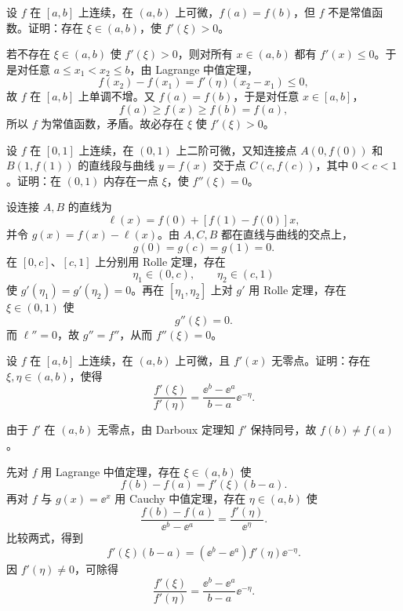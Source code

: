 \begin{xexercise}[16]
设 $f$ 在 $[a,b]$ 上连续，在 $(a,b)$ 上可微，$f(a)=f(b)$，但 $f$ 不是常值函数。证明：存在 $\xi\in(a,b)$，使 $f'(\xi)>0$。
\end{xexercise}
\begin{xsolution}
若不存在 $\xi\in(a,b)$ 使 $f'(\xi)>0$，则对所有 $x\in(a,b)$ 都有 $f'(x)\leqslant0$。于是对任意 $a\leqslant x_1<x_2\leqslant b$，由 Lagrange 中值定理，
\[
  f(x_2)-f(x_1)=f'(\eta)(x_2-x_1)\leqslant0,
\]
故 $f$ 在 $[a,b]$ 上单调不增。又 $f(a)=f(b)$，于是对任意 $x\in[a,b]$，
\[
  f(a)\geqslant f(x)\geqslant f(b)=f(a),
\]
所以 $f$ 为常值函数，矛盾。故必存在 $\xi$ 使 $f'(\xi)>0$。
\end{xsolution}


\begin{xexercise}[17]
设 $f$ 在 $[0,1]$ 上连续，在 $(0,1)$ 上二阶可微，又知连接点 $A(0,f(0))$ 和 $B(1,f(1))$ 的直线段与曲线 $y=f(x)$ 交于点 $C(c,f(c))$，其中 $0<c<1$。证明：在 $(0,1)$ 内存在一点 $\xi$，使 $f''(\xi)=0$。
\end{xexercise}
\begin{xsolution}
设连接 $A,B$ 的直线为
\[
  \ell(x)=f(0)+[f(1)-f(0)]x,
\]
并令 $g(x)=f(x)-\ell(x)$。由 $A,C,B$ 都在直线与曲线的交点上，
\[
  g(0)=g(c)=g(1)=0.
\]
在 $[0,c]$、$[c,1]$ 上分别用 Rolle 定理，存在
\[
  \eta_1\in(0,c),\qquad \eta_2\in(c,1)
\]
使 $g'(\eta_1)=g'(\eta_2)=0$。再在 $[\eta_1,\eta_2]$ 上对 $g'$ 用 Rolle 定理，存在 $\xi\in(0,1)$ 使
\[
  g''(\xi)=0.
\]
而 $\ell''=0$，故 $g''=f''$，从而 $f''(\xi)=0$。
\end{xsolution}


\begin{xexercise}[18]
设 $f$ 在 $[a,b]$ 上连续，在 $(a,b)$ 上可微，且 $f'(x)$ 无零点。证明：存在 $\xi,\eta\in(a,b)$，使得
\[
  \frac{f'(\xi)}{f'(\eta)}=\frac{\ee^b-\ee^a}{b-a}\ee^{-\eta}.
\]
\end{xexercise}
\begin{xsolution}
由于 $f'$ 在 $(a,b)$ 无零点，由 Darboux 定理知 $f'$ 保持同号，故 $f(b)\neq f(a)$。

先对 $f$ 用 Lagrange 中值定理，存在 $\xi\in(a,b)$ 使
\[
  f(b)-f(a)=f'(\xi)(b-a).
\]
再对 $f$ 与 $g(x)=\ee^x$ 用 Cauchy 中值定理，存在 $\eta\in(a,b)$ 使
\[
  \frac{f(b)-f(a)}{\ee^b-\ee^a}
  =\frac{f'(\eta)}{\ee^\eta}.
\]
比较两式，得到
\[
  f'(\xi)(b-a)
  =(\ee^b-\ee^a)f'(\eta)\ee^{-\eta}.
\]
因 $f'(\eta)\neq0$，可除得
\[
  \frac{f'(\xi)}{f'(\eta)}
  =\frac{\ee^b-\ee^a}{b-a}\ee^{-\eta}.
\]
\end{xsolution}


